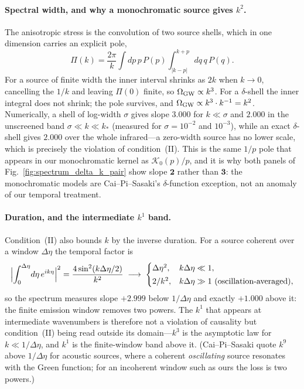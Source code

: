 \documentclass[10pt,prd,aps,nobibnotes,superscriptaddress,preprintnumbers,notitlepage]{revtex4-1}
\begin{document}
\paragraph{Spectral width, and why a monochromatic source gives $k^{2}$.}
The anisotropic stress is the convolution of two source shells, which in one dimension
carries an explicit pole,
\begin{equation}
  \Pi(k)=\frac{2\pi}{k}\int\!dp\,p\,P(p)\!\int_{|k-p|}^{k+p}\!\!dq\,q\,P(q).
  \label{eq:stress-convolution-1d}
\end{equation}
For a source of finite width the inner interval shrinks as $2k$ when $k\to0$, cancelling
the $1/k$ and leaving $\Pi(0)$ finite, so $\Omega_{\rm GW}\propto k^{3}$. For a
$\delta$-shell the inner integral does not shrink; the pole survives, and
$\Omega_{\rm GW}\propto k^{3}\cdot k^{-1}=k^{2}$. Numerically, a shell of log-width
$\sigma$ gives slope $3.000$ for $k\ll\sigma$ and $2.000$ in the unscreened band
$\sigma\ll k\ll k_{*}$ (measured for $\sigma=10^{-2}$ and $10^{-3}$), while an exact
$\delta$-shell gives $2.000$ over the whole infrared---a zero-width source has no lower
scale, which is precisely the violation of condition~(II). This is the same $1/p$ pole
that appears in our monochromatic kernel as $\mathcal{K}_{0}(p)/p$, and it is why both
panels of Fig.~\ref{fig:spectrum_delta_k_pair} show slope $\mathbf{2}$ rather than
$\mathbf{3}$: the monochromatic models are Cai--Pi--Sasaki's $\delta$-function exception,
not an anomaly of our temporal treatment.

\paragraph{Duration, and the intermediate $k^{1}$ band.}
Condition~(II) also bounds $k$ by the inverse duration. For a source coherent over a
window $\Delta\eta$ the temporal factor is
\begin{equation}
  \Bigl|\int_{0}^{\Delta\eta}\!d\eta\,e^{ik\eta}\Bigr|^{2}
  =\frac{4\sin^{2}(k\Delta\eta/2)}{k^{2}}
  \;\longrightarrow\;
  \begin{cases}
    \Delta\eta^{2}, & k\Delta\eta\ll1,\\[2pt]
    2/k^{2}, & k\Delta\eta\gg1\ \text{(oscillation-averaged)},
  \end{cases}
  \label{eq:window-factor}
\end{equation}
so the spectrum measures slope $+2.999$ below $1/\Delta\eta$ and exactly $+1.000$ above
it: the finite emission window removes two powers. The $k^{1}$ that appears at
intermediate wavenumbers is therefore not a violation of causality but condition~(II)
being read outside its domain---$k^{3}$ is the asymptotic law for $k\ll1/\Delta\eta$,
and $k^{1}$ is the finite-window band above it. (Cai--Pi--Sasaki quote $k^{9}$ above
$1/\Delta\eta$ for acoustic sources, where a coherent \emph{oscillating} source resonates
with the Green function; for an incoherent window such as ours the loss is two powers.)
\end{document}
